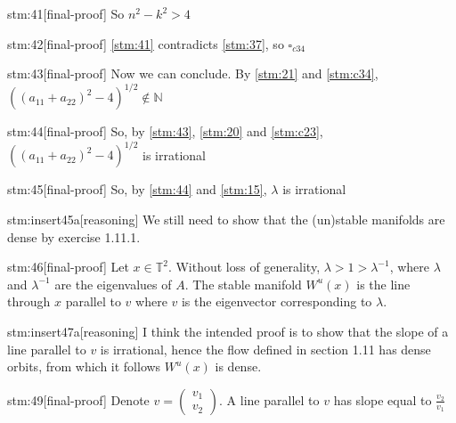 \documentclass{article}
\begin{document}
\begin{stm}{stm:41}[final-proof]
So $n^2 - k^2 > 4$
\end{stm}

\begin{stm}{stm:42}[final-proof]
\ref{stm:41} contradicts \ref{stm:37}, so $\square_{c34}$
\end{stm}

\begin{stm}{stm:43}[final-proof]
Now we can conclude. By \ref{stm:21} and \ref{stm:c34}, $((a_{11} + a_{22})^2 - 4)^{1/2} \notin \mathbb{N}$
\end{stm}

\begin{stm}{stm:44}[final-proof]
So, by \ref{stm:43}, \ref{stm:20} and \ref{stm:c23}, $((a_{11} + a_{22})^2 - 4)^{1/2}$ is irrational
\end{stm}

\begin{stm}{stm:45}[final-proof]
So, by \ref{stm:44} and \ref{stm:15}, $\lambda$ is irrational
\end{stm}

\begin{stm}{stm:insert45a}[reasoning]
We still need to show that the (un)stable manifolds are dense by exercise 1.11.1.
\end{stm}

\begin{stm}{stm:46}[final-proof]
Let $x \in \mathbb{T}^2$. Without loss of generality, $\lambda > 1 > \lambda^{-1}$, where $\lambda$ and $\lambda^{-1}$ are the eigenvalues of $A$. The stable manifold $W^u(x)$ is the line through $x$ parallel to $v$ where $v$ is the eigenvector corresponding to $\lambda$.
\end{stm}

\begin{stm}{stm:insert47a}[reasoning]
I think the intended proof is to show that the slope of a line parallel to $v$ is irrational, hence the flow defined in section 1.11 has dense orbits, from which it follows $W^u(x)$ is dense.
\end{stm}

\begin{stm}{stm:49}[final-proof]
Denote $v = \begin{pmatrix} v_1 \\ v_2 \end{pmatrix}$. A line parallel to $v$ has slope equal to $\frac{v_2}{v_1}$
\end{stm}
\end{document}
